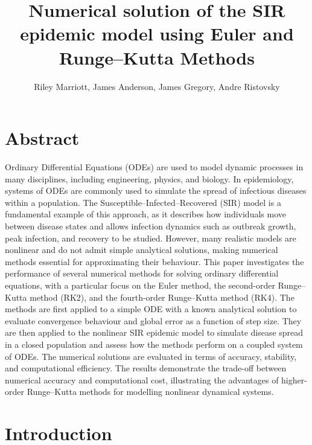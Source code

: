\documentclass{article}
\title{Numerical solution of the SIR epidemic model using Euler and Runge--Kutta Methods}
\author{Riley Marriott, James Anderson, James Gregory, Andre Ristovsky}
\begin{document}
\maketitle

\section*{Abstract}

Ordinary Differential Equations (ODEs) are used to model dynamic processes in many disciplines, including engineering, physics, and biology. In epidemiology, systems of ODEs are commonly used to simulate the spread of infectious diseases within a population. The Susceptible--Infected--Recovered (SIR) model is a fundamental example of this approach, as it describes how individuals move between disease states and allows infection dynamics such as outbreak growth, peak infection, and recovery to be studied. However, many realistic models are nonlinear and do not admit simple analytical solutions, making numerical methods essential for approximating their behaviour.
This paper investigates the performance of several numerical methods for solving ordinary differential equations, with a particular focus on the Euler method, the second-order Runge--Kutta method (RK2), and the fourth-order Runge--Kutta method (RK4). The methods are first applied to a simple ODE with a known analytical solution to evaluate convergence behaviour and global error as a function of step size. They are then applied to the nonlinear SIR epidemic model to simulate disease spread in a closed population and assess how the methods perform on a coupled system of ODEs. The numerical solutions are evaluated in terms of accuracy, stability, and computational efficiency. The results demonstrate the trade-off between numerical accuracy and computational cost, illustrating the advantages of higher-order Runge--Kutta methods for modelling nonlinear dynamical systems.

\section{Introduction}
\end{document}

